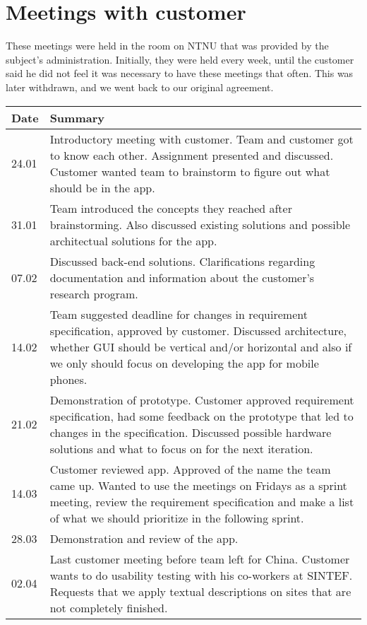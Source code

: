 \section{Meetings with customer}
These meetings were held in the room on NTNU that was provided by the subject's administration. Initially, they were held every week, until the customer said he did not feel it was necessary to have these meetings that often. This was later withdrawn, and we went back to our original agreement.
\begin{table}[H]
\centering
\begin{tabular}{|l|p{14.7cm}|}
\hline
\textbf{Date}&\textbf{Summary}\\\hline
24.01& Introductory meeting with customer. Team and customer got to know each other. Assignment presented and discussed. Customer wanted team to brainstorm to figure out what should be in the app.\\\hline
31.01& Team introduced the concepts they reached after brainstorming. Also discussed existing solutions and possible architectual solutions for the app.\\\hline
07.02& Discussed back-end solutions. Clarifications regarding documentation and information about the customer's research program.\\\hline
14.02& Team suggested deadline for changes in requirement specification, approved by customer. Discussed architecture, whether GUI should be vertical and/or horizontal and also if we only should focus on developing the app for mobile phones.\\\hline
21.02&Demonstration of prototype. Customer approved requirement specification, had some feedback on the prototype that led to changes in the specification. Discussed possible hardware solutions and what to focus on for the next iteration. \\\hline
14.03& Customer reviewed app. Approved of the name the team came up. Wanted to use the meetings on Fridays as a sprint meeting, review the requirement specification and make a list of what we should prioritize in the following sprint.\\\hline
28.03& Demonstration and review of the app.\\\hline
02.04& Last customer meeting before team left for China. Customer wants to do usability testing with his co-workers at SINTEF. Requests that we apply textual descriptions on sites that are not completely finished.\\\hline

\end{tabular}
\end{table}
